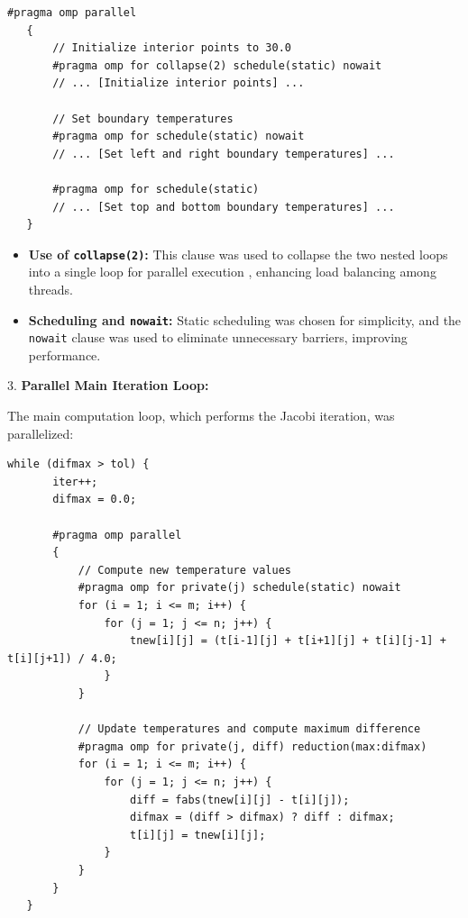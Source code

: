 \documentclass{article}
\begin{document}
   \begin{lstlisting}[style=CStyle, caption={Parallel Initialization}]
   #pragma omp parallel
   {
       // Initialize interior points to 30.0
       #pragma omp for collapse(2) schedule(static) nowait
       // ... [Initialize interior points] ...

       // Set boundary temperatures
       #pragma omp for schedule(static) nowait
       // ... [Set left and right boundary temperatures] ...

       #pragma omp for schedule(static)
       // ... [Set top and bottom boundary temperatures] ...
   }
   \end{lstlisting}

    \begin{itemize}
        \item \textbf{Use of \texttt{collapse(2)}:} This clause was used to collapse the two nested loops into a single loop for parallel execution \parencite{openmp}, enhancing load balancing among threads.
        \item \textbf{Scheduling and \texttt{nowait}:} Static scheduling was chosen for simplicity, and the \texttt{nowait} clause was used to eliminate unnecessary barriers, improving performance.
    \end{itemize}

3. \textbf{Parallel Main Iteration Loop:}

   The main computation loop, which performs the Jacobi iteration, was parallelized:

   \begin{lstlisting}[style=CStyle, caption={Parallel Main Iteration Loop}]
   while (difmax > tol) {
       iter++;
       difmax = 0.0;

       #pragma omp parallel
       {
           // Compute new temperature values
           #pragma omp for private(j) schedule(static) nowait
           for (i = 1; i <= m; i++) {
               for (j = 1; j <= n; j++) {
                   tnew[i][j] = (t[i-1][j] + t[i+1][j] + t[i][j-1] + t[i][j+1]) / 4.0;
               }
           }

           // Update temperatures and compute maximum difference
           #pragma omp for private(j, diff) reduction(max:difmax)
           for (i = 1; i <= m; i++) {
               for (j = 1; j <= n; j++) {
                   diff = fabs(tnew[i][j] - t[i][j]);
                   difmax = (diff > difmax) ? diff : difmax;
                   t[i][j] = tnew[i][j];
               }
           }
       }
   }
   \end{lstlisting}
\end{document}
